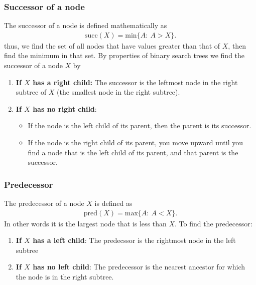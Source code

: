 \documentclass{report}
\begin{document}
\bigbreak \noindent 
\subsubsection{Successor of a node}
\bigbreak \noindent 
The successor of a node is defined mathematically as
\begin{align*}
    \text{succ}(X) = \text{min}\{A:\ A > X\}
.\end{align*}
\bigbreak \noindent 
thus, we find the set of all nodes that have values greater than that of $X$, then find the minimum in that set.
\bigbreak \noindent 
By properties of binary search trees we find the successor of a node $X$ by 
\begin{enumerate}
    \item \textbf{If $X$ has a right child:} The successor is the leftmost node in the right subtree of $X$ (the smallest node in the right subtree).
    \item \textbf{If $X$ has no right child}:
        \begin{itemize}
            \item If the node is the left child of its parent, then the parent is its successor.
            \item If the node is the right child of its parent, you move upward until you find a node that is the left child of its parent, and that parent is the successor.
        \end{itemize}
\end{enumerate}

\pagebreak 
\subsubsection{Predecessor}
\bigbreak \noindent 
The predecessor of a node $X$ is defined as
\begin{align*}
    \text{pred}(X) = \text{max}\{A:\ A < X\}
.\end{align*}
\bigbreak \noindent 
In other words it is the largest node that is less than $X$. To find the predecessor:
\begin{enumerate}
    \item \textbf{If $X$ has a left child}: The predecssor is the rightmost node in the left subtree
    \item \textbf{If $X$ has no left child}: The predecessor is the nearest ancestor for which the node is in the right subtree.
\end{enumerate}

\bigbreak \noindent 
\end{document}
